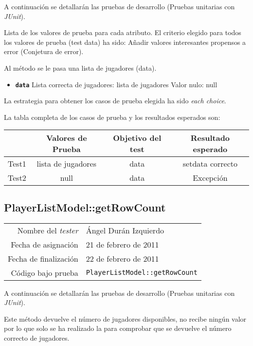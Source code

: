 A continuación se detallarán las pruebas de desarrollo (Pruebas unitarias con \textit{JUnit}).

Lista de los valores de prueba para cada atributo.
El criterio elegido para todos los valores de prueba (test data) ha sido: Añadir valores interesantes propensos a error (Conjetura de error).

Al m\'etodo se le pasa una lista de jugadores (data).

\begin{itemize}
\item \textbf{\texttt{data}}
\subitem Lista correcta de jugadores: lista de jugadores
\subitem Valor nulo: null
\end{itemize}

La estrategia para obtener los casos de prueba elegida ha sido
\textit{each choice}.

La tabla completa de los casos de prueba y los resultados esperados son:

{\footnotesize
\begin{longtable}[c]{lccc}
 & \textbf{Valores de Prueba} & \textbf{Objetivo del test} & \textbf{Resultado esperado} \\
\hline \hline
\endhead

Test1 & lista de jugadores & data & setdata correcto\\
Test2 & null & data & Excepci\'on\\

\hline
\end{longtable}
}

\subsection{PlayerListModel::getRowCount}

{\small
\begin{tabular}{r|l}
Nombre del \textit{tester} & \'Angel Dur\'an Izquierdo\\
Fecha de asignación & 21 de febrero de 2011 \\
Fecha de finalización & 22 de febrero de 2011 \\
Código bajo prueba & \texttt{PlayerListModel::getRowCount}
\end{tabular}
}

A continuación se detallarán las pruebas de desarrollo (Pruebas unitarias con \textit{JUnit}).

Este m\'etodo devuelve el n\'umero de jugadores disponibles, no recibe ning\'un valor por lo que solo se ha realizado la para comprobar que se devuelve el n\'umero correcto de jugadores.

